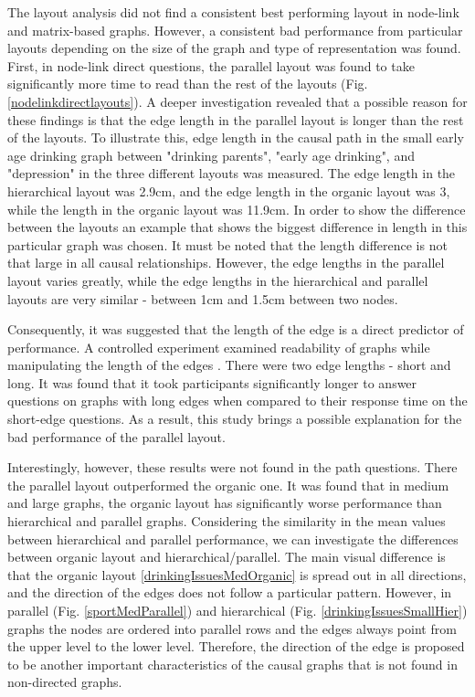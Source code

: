 \documentclass{l4proj}
\begin{document}
The layout analysis did not find a consistent best performing layout in node-link and matrix-based graphs. However, a consistent bad performance from particular layouts depending on the size of the graph and type of representation was found. First, in node-link direct questions, the parallel layout was found to take significantly more time to read than the rest of the layouts (Fig.  \ref{nodelinkdirectlayouts}). A deeper investigation revealed that a possible reason for these findings is that the edge length in the parallel layout is longer than the rest of the layouts. To illustrate this, edge length in the causal path in the small early age drinking graph between "drinking parents", "early age drinking", and "depression" in the three different layouts was measured. The edge length in the hierarchical layout was 2.9cm, and the edge length in the organic layout was 3, while the length in the organic layout was 11.9cm. In order to show the difference between the layouts an example that shows the biggest difference in length in this particular graph was chosen. It must be noted that the length difference is not that large in all causal relationships. However, the edge lengths in the parallel layout varies greatly, while the edge lengths in the hierarchical and parallel layouts are very similar - between 1cm and 1.5cm between two nodes. 

Consequently, it was suggested that the length of the edge is a direct predictor of performance. A controlled experiment examined readability of graphs while manipulating the length of the edges \cite{holten2011extended}. There were two edge lengths - short and long. It was found that it took participants significantly longer to answer questions on graphs with long edges when compared to their response time on the short-edge questions. As a result, this study brings a possible explanation for the bad performance of the parallel layout.

Interestingly, however, these results were not found in the path questions. There the parallel layout outperformed the organic one. It was found that in medium and large graphs, the organic layout has significantly worse performance than hierarchical and parallel graphs. Considering the similarity in the mean values between hierarchical and parallel performance, we can investigate the differences between organic layout and hierarchical/parallel. The main visual difference is that the organic layout \ref{drinkingIssuesMedOrganic} is spread out in all directions, and the direction of the edges does not follow a particular pattern. However, in parallel (Fig. \ref{sportMedParallel}) and hierarchical (Fig. \ref{drinkingIssuesSmallHier}) graphs the nodes are ordered into parallel rows and the edges always point from the upper level to the lower level. Therefore, the direction of the edge is proposed to be another important characteristics of the causal graphs that is not found in non-directed graphs.
\end{document}
